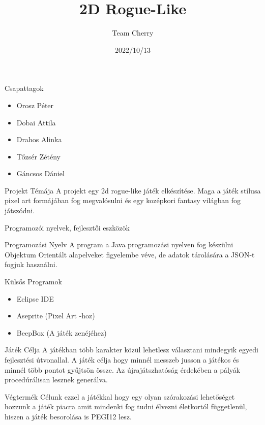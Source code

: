 \documentclass[14pt, aspectratio=169]{beamer}
\title{2D Rogue-Like}
\author{Team Cherry}
\date{2022/10/13}
\begin{document}
	\maketitle
	\begin{frame}{Csapattagok}
		\begin{itemize}
			\item Orosz Péter
			\item Dobai Attila
			\item Drahos Alinka
			\item Tőzsér Zétény
			\item Gáncsos Dániel
		\end{itemize}
	\end{frame}
	
	\begin{frame}{Projekt Témája}
		A projekt egy 2d rogue-like játék elkészítése. Maga a játék stílusa pixel art formájában fog megvalósulni és egy kozépkori fantasy világban fog játszódni.
	\end{frame}
	
	\begin{frame}{Programozói nyelvek, fejlesztői eszközök}
		\begin{block}{Programozási Nyelv}
			A program a Java programozási nyelven fog készülni Objektum Orientált alapelveket figyelembe véve, de adatok tárolására a JSON-t fogjuk használni.
		\end{block}
		
		\begin{block}{Külsős Programok}
			\begin{itemize}
				\item Eclipse IDE
				\item Aseprite (Pixel Art -hoz)
				\item BeepBox (A játék zenéjéhez)
			\end{itemize}
		\end{block}
	\end{frame}
	
	\begin{frame}{Játék Célja}
		A játékban több karakter közül lehetlesz választani mindegyik egyedi fejlesztési útvonallal. A játék célja hogy minnél messzeb jusson a játékos és minnél több pontot gyűjtsön össze. Az újrajátszhatóság érdekében a pályák procedúrálisan lesznek generálva. 
	\end{frame}		
	
	\begin{frame}{Végtermék}
		Célunk ezzel a játékkal hogy egy olyan szórakozási lehetőséget hozzunk a játék piacra amit mindenki fog tudni élvezni életkortól függetlenül, hiszen a játék besorolása is PEGI12 lesz.
	\end{frame}
\end{document}
